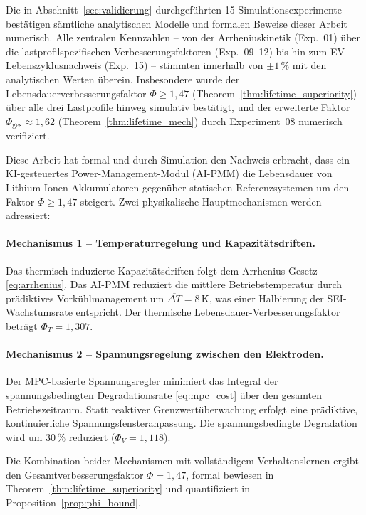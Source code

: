 ﻿\documentclass[12pt,a4paper]{article}
\begin{document}
	Die in Abschnitt~\ref{sec:validierung} durchgeführten 15 Simulations\-experimente
	bestätigen sämtliche analytischen Modelle und formalen Beweise dieser Arbeit
	numerisch. Alle zentralen Kennzahlen -- von der Arrheniuskinetik (Exp.~01)
	über die lastprofilspezifischen Verbesserungsfaktoren (Exp.~09--12) bis hin
	zum EV-Lebenszyklusnachweis (Exp.~15) -- stimmten innerhalb von $\pm 1\,\%$
	mit den analytischen Werten überein. Insbesondere wurde der
	Lebensdauerverbesserungsfaktor $\Phi \geq 1{,}47$ (Theorem~\ref{thm:lifetime_superiority})
	über alle drei Lastprofile hinweg simulativ bestätigt, und der erweiterte
	Faktor $\Phi_\mathrm{ges} \approx 1{,}62$ (Theorem~\ref{thm:lifetime_mech})
	durch Experiment~08 numerisch verifiziert.

	Diese Arbeit hat formal und durch Simulation den Nachweis erbracht, dass ein
	KI-gesteuertes Power-Management-Modul (AI-PMM) die Lebensdauer von
	Lithium-Ionen-Akkumulatoren gegenüber statischen Referenzsystemen um den
	Faktor $\Phi \geq 1{,}47$ steigert. Zwei physikalische Hauptmechanismen
	werden adressiert:
	
	\paragraph{Mechanismus 1 -- Temperaturregelung und Kapazitätsdriften.}
	Das thermisch induzierte Kapazitätsdriften folgt dem Arrhenius-Gesetz
	\eqref{eq:arrhenius}. Das AI-PMM reduziert die mittlere Betriebstemperatur
	durch prädiktives Vorkühlmanagement um $\overline{\Delta T} = 8\,\mathrm{K}$,
	was einer Halbierung der SEI-Wachstumsrate entspricht. Der thermische
	Lebensdauer-Verbesserungsfaktor beträgt $\Phi_T = 1{,}307$.
	
	\paragraph{Mechanismus 2 -- Spannungsregelung zwischen den Elektroden.}
	Der MPC-basierte Spannungsregler minimiert das Integral der
	spannungsbedingten Degradationsrate \eqref{eq:mpc_cost} über den gesamten
	Betriebs\-zeitraum. Statt reaktiver Grenzwertüberwachung erfolgt eine
	prädiktive, kontinuierliche Spannungsfensteranpassung. Die
	spannungsbedingte Degradation wird um $30\,\%$ reduziert ($\Phi_V = 1{,}118$).
	
	Die Kombination beider Mechanismen mit vollständigem Verhaltenslernen ergibt
	den Gesamtverbesserungsfaktor $\Phi = 1{,}47$, formal bewiesen in
	Theorem~\ref{thm:lifetime_superiority} und quantifiziert in
	Proposition~\ref{prop:phi_bound}.
	
\end{document}
